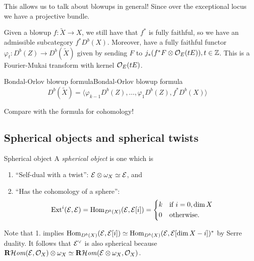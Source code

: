This allows us to talk about blowups in general! Since over the exceptional locus we have a projective bundle.

Given a blowup $f:\tilde{X}\to X$, we still have that $f^*$ is fully faithful, so we have an admissible subcategory $f^*D^b(X)$. Moreover, have a fully faithful functor $\varphi_{t}:D^b(Z)\to D^b(\tilde{X})$ given by sending $F$ to $j_{*}(f^*F\otimes \mathcal{O}_{E}(tE)), t\in \mathbb{Z}$. This is a Fourier-Mukai transform with kernel $\mathcal{O}_{E}(tE)$.


\begin{theorem}{Bondal-Orlov blowup formula}{Bondal-Orlov blowup formula}
    $$D^b(\tilde{X})=\langle \varphi_{{k-1}}D^b(Z),\dots,\varphi_{1}D^b(Z), f^*D^b(X)\rangle$$
\end{theorem}

Compare with the formula for cohomology!


\subsection{Spherical objects and spherical twists}

\begin{definition}{Spherical object}{}
    A \emph{spherical object} is one which is
    \begin{enumerate}
        \item ``Self-dual with a twist'': $\mathcal{E}\otimes\omega_X\simeq\mathcal{E}$, and
        \item ``Has the cohomology of a sphere'':
            \begin{equation*}
                \Ext^i(\calE,\calE)
                    = \Hom_{D^b(X)}(\calE,\calE[i])
                    = \begin{cases*}
                        k & if $i=0,\dim X$ \\
                        0 & otherwise.
                    \end{cases*}
            \end{equation*}
    \end{enumerate}
\end{definition}

Note that 1. implies $\operatorname{Hom}_{D^b(X)}(\mathcal{E},\mathcal{E}[i])\simeq\operatorname{Hom}_{D^b(X)}(\mathcal{E},\mathcal{E}[\dim X-i])^*$
by Serre duality. It follows that $\mathcal{E}^\vee$ is also spherical because
$\operatorname{\mathbf{R}\mathcal{H}\mathit{om}}(\mathcal{E},\mathcal{O}_X)\otimes\omega_X\simeq\operatorname{\mathbf{R}\mathcal{H}\mathit{om}}(\mathcal{E}\otimes\omega_X,\mathcal{O}_X)$.

